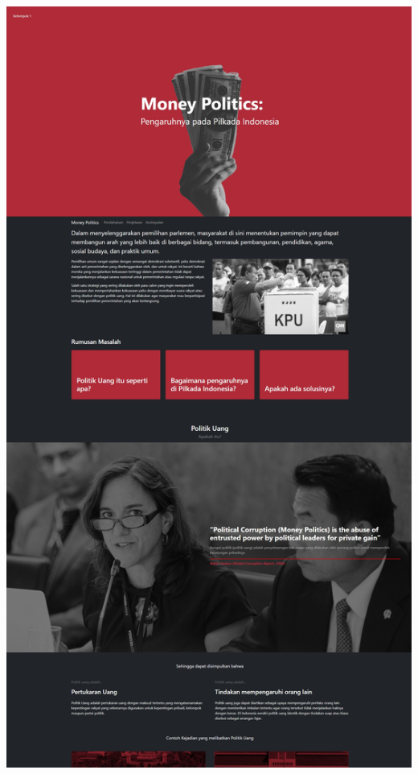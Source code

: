 \documentclass[12pt]{article}
\begin{document}
\begin{minipage}[b]{0.47\textwidth}
    \includegraphics[width=\textwidth,keepaspectratio]{Asset/website.jpg}
\end{minipage}
\end{document}
